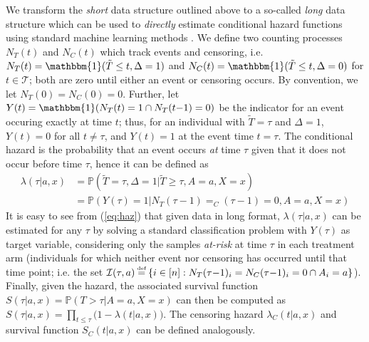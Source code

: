 \documentclass{article}
\newcommand{\Tc}{{\mathcal T}}
\newcommand{\one}{{\mathbbm{1}}}
\newcommand{\minus}{{-}} %
\newcommand{\PR}{{\mathbb P}}
\newcommand\defeq{\mathrel{\stackrel{\makebox[0pt]{\mbox{\normalfont\tiny def}}}{=}}}
\begin{document}
We transform the \textit{short} data structure outlined above to a so-called \textit{long} data structure which can be used to \textit{directly} estimate conditional hazard functions using standard machine learning methods \cite{stitelman2010collaborative}. We define two counting processes $N_T(t)$ and $N_C(t)$ which track events and censoring, i.e. $N_T(t)=\mathbbm{1}(\tilde{T} \leq t, \Delta =1)$ and $N_C(t)=\mathbbm{1}(\tilde{T} \leq t, \Delta =0)$ for $t \in \Tc$; both are zero until either an event or censoring occurs. By convention, we let $N_T(0)=N_C(0)=0$. Further, let $Y(t) = \one(N_{T}(t)=1 \cap N_{T}(t\minus 1)=0)$ be the indicator for an event occuring exactly at time $t$; thus, for an individual with $\tilde{T}=\tau$ and $\Delta=1$, $Y(t) = 0$ for all $t\neq \tau$, and $Y(t)=1$ at the event time $t=\tau$. The conditional hazard is the probability that an event occurs \textit{at} time $\tau$ given that it does not occur before time $\tau$, hence it can be defined as \cite{cai2019targeted}
\begin{equation}\label{eq:haz}
    \begin{split}
      \lambda(\tau|a,x) &= \PR(\tilde{T}=\tau, \Delta = 1|\tilde{T} \geq \tau, A=a, X=x) \\
      &= \PR(Y(\tau)=1| N_T(\tau \minus 1)=_C(\tau \minus 1)=0, A=a, X=x) 
      \end{split}
\end{equation}
It is easy to see from (\ref{eq:haz}) that given data in long format, $\lambda(\tau|a,x)$ can be estimated for any $\tau$ by solving a standard classification problem with $Y(\tau)$ as target variable, considering only the samples \textit{at-risk} at time $\tau$ in each treatment arm (individuals for which neither event nor censoring has occurred until that time point; i.e. the set $\mathcal{I}(\tau, a) \defeq \{i \in [n]: N_{T}(\tau \minus 1)_{i} = N_{C}(\tau \minus 1)_{i} =0 \cap  A_i=a\}$). Finally, given the hazard, the associated survival function $S(\tau|a,x) = \PR(T>\tau |A=a, X=x)$ can then be computed as $S(\tau|a,x)=\prod_{t \leq \tau}\big(1 - \lambda(t|a, x)\big)$. The censoring hazard $\lambda_{C}(t|a,x)$ and survival function $S_C(t|a, x)$ can be defined analogously. 
\end{document}
